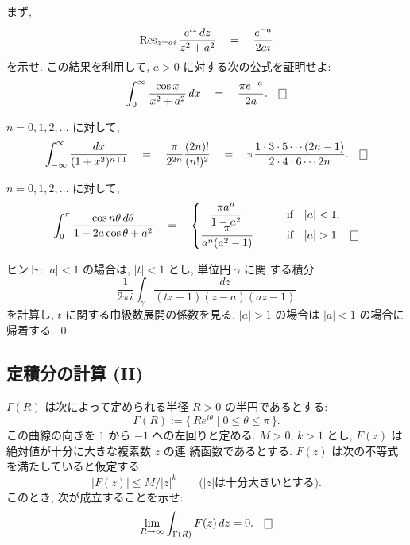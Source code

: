 \documentclass[12pt,twoside]{jarticle}
\begin{document}
\begin{question}
  まず, 
  \[
    \mathop{\mathrm{Res}}\nolimits_{z=ai}\frac{e^{iz}\,dz}{z^2 + a^2} 
    \quad = \quad
    \frac{e^{-a}}{2ai}
  \]
  を示せ. この結果を利用して, $a > 0$ に対する次の公式を証明せよ:
  \[
    \int_0^\infty \frac{\cos x}{x^2 + a^2}\,dx
    \quad = \quad
    \frac{\pi e^{-a}}{2a}.
  \qed
  \]
\end{question}

\begin{question}
  $n = 0,1,2,\dots$ に対して,
  \[
    \int_{-\infty}^\infty \frac{dx}{(1+x^2)^{n+1}}
    \quad = \quad
    \frac{\pi}{2^{2n}}\frac{(2n)!}{(n!)^2}
    \quad = \quad
    \pi \frac{1 \cdot 3 \cdot 5 \cdots (2n - 1)}
             {2 \cdot 4 \cdot 6 \cdots 2n}.
    \qed
  \]
\end{question}

\begin{question}
  $n=0,1,2,\dots$ に対して,
  \[
    \int_0^\pi \frac{\cos n\theta\,d\theta}
                    {1 - 2a \cos\theta + a^2}
    \quad = \quad
    \begin{cases}
      \displaystyle \;\;\;
      \frac{\pi a^n}{1 - a^2}  \qquad & \text{if}\quad |a|<1,\\
      \displaystyle
      \frac{\pi}{a^n(a^2 - 1)} \qquad & \text{if}\quad |a|>1. \qed
    \end{cases}
  \]
\end{question}

\noindent ヒント: $|a|<1$ の場合は, $|t|<1$ とし, 単位円 $\gamma$ に関
する積分
\[
  \frac{1}{2\pi i} \int_\gamma \frac{dz}{(tz-1)(z-a)(az-1)}
\]
を計算し, $t$ に関する巾級数展開の係数を見る. $|a|>1$ の場合は $|a|<1$ %
の場合に帰着する. \qed


\subsection{定積分の計算 (II)}

\begin{question}
  $\Gamma(R)$ は次によって定められる半径 $R > 0$ の半円であるとする:
  \[
    \Gamma(R) := \{ \,R e^{i\theta} \mid 0 \le \theta \le \pi \,\}.
  \]%
  この曲線の向きを $1$ から $-1$ への左回りと定める. %
  $M > 0$, $k > 1$ とし, $F(z)$ は絶対値が十分に大きな複素数 $z$ の連
  続函数であるとする.  $F(z)$ は次の不等式を満たしていると仮定する:
  \[
    |F(z)| \le M / |z|^k  \qquad\mbox{($|z|$は十分大きいとする)}.
  \]
  このとき, 次が成立することを示せ:
  \[
    \lim_{R\to\infty} \int_{\Gamma(R)} F(z)\,dz = 0.
    \qed
  \]
\end{question}
\end{document}
